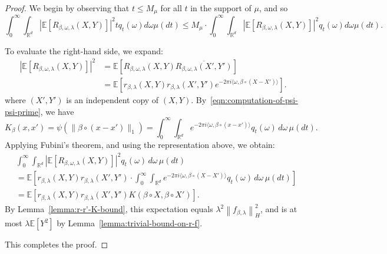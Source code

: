 \documentclass[sn-mathphys-num]{sn-jnl}%
\numberwithin{equation}{section}
\newcommand{\R}{\mathbb{R}}
\newcommand{\E}{\mathbb{E}}
\newcommand{\kernel}{K}
\newcommand{\norm}[1]{\left\|{#1}\right\|} %
\newcommand{\profile}{\psi}
\theoremstyle{thmstyleone}%
\theoremstyle{thmstyletwo}%
\theoremstyle{thmstylethree}%
\begin{document}
\begin{proof}
We begin by observing that $t \le M_\mu$ for all $t$ in the support of $\mu$, and so
\begin{equation*}
	\int_0^\infty \int_{\R^d} |\E[R_{\beta, \omega, \lambda}(X, Y)]|^2 t q_t(\omega) d\omega \mu(dt)
		\le M_\mu \cdot \int_0^\infty \int_{\R^d} |\E[R_{\beta, \omega, \lambda}(X, Y)]|^2 q_t(\omega) d\omega \mu(dt). 
\end{equation*} 

To evaluate the right-hand side, we expand:
\begin{equation*}
\begin{split} 
	|\E[R_{\beta, \omega, \lambda}(X, Y)]|^2 &= \E[R_{\beta, \omega, \lambda}(X, Y) \overline{R_{\beta, \omega, \lambda}(X', Y')}] \\
		&=  \E[r_{\beta, \lambda}(X, Y) r_{\beta, \lambda}(X', Y') e^{-2\pi i \langle \omega, \beta \circ (X-X')\rangle}].
\end{split} 
\end{equation*}
where $(X', Y')$ is an independent copy of $(X, Y)$.
By~\eqref{eqn:computation-of-psi-psi-prime}, we have 
\[
\kernel_\beta(x, x') 
= \profile(\|\beta \circ (x - x')\|_1)
= \int_0^\infty \int_{\R^d} e^{-2\pi i \langle \omega, \beta \circ (x - x') \rangle} q_t(\omega) \, d\omega \, \mu(dt).
\]
Applying Fubini’s theorem, and using the representation above, we obtain:
\begin{equation*} 
\begin{split}
&\int_0^\infty \int_{\R^d} |\E[R_{\beta, \omega, \lambda}(X, Y)]|^2 q_t(\omega) \, d\omega \, \mu(dt)  \\
&= \E\left[ r_{\beta, \lambda}(X, Y) r_{\beta, \lambda}(X', Y') \cdot \int_0^\infty \int_{\R^d} 
	e^{-2\pi i \langle \omega, \beta \circ (X - X') \rangle} q_t(\omega) \, d\omega \, \mu(dt) \right] \\
&= \E\left[ r_{\beta, \lambda}(X, Y) r_{\beta, \lambda}(X', Y') \kernel(\beta \circ X, \beta \circ X') \right].
\end{split}
\end{equation*}
By Lemma~\ref{lemma:r-r'-K-bound}, this expectation equals $\lambda^2 \norm{f_{\beta, \lambda}}_H^2$, and 
is at most $\lambda \E[Y^2]$ by Lemma~\ref{lemma:trivial-bound-on-r-f}. 

This completes the proof. 
\end{proof} 
\end{document}
